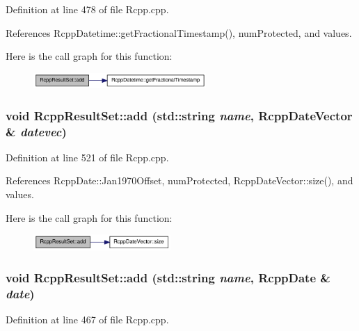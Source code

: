 Definition at line 478 of file Rcpp.cpp.

References RcppDatetime::getFractionalTimestamp(), numProtected, and values.

Here is the call graph for this function:\nopagebreak
\begin{figure}[H]
\begin{center}
\leavevmode
\includegraphics[width=186pt]{classRcppResultSet_a1d921e7a24e50369ae67a1bc63826131_cgraph}
\end{center}
\end{figure}
\hypertarget{classRcppResultSet_ad7efd746596959ce68ca98c690a2f645}{
\subsubsection[{add}]{\setlength{\rightskip}{0pt plus 5cm}void RcppResultSet::add (std::string {\em name}, \/  {\bf RcppDateVector} \& {\em datevec})}}
\label{classRcppResultSet_ad7efd746596959ce68ca98c690a2f645}


Definition at line 521 of file Rcpp.cpp.

References RcppDate::Jan1970Offset, numProtected, RcppDateVector::size(), and values.

Here is the call graph for this function:\nopagebreak
\begin{figure}[H]
\begin{center}
\leavevmode
\includegraphics[width=148pt]{classRcppResultSet_ad7efd746596959ce68ca98c690a2f645_cgraph}
\end{center}
\end{figure}
\hypertarget{classRcppResultSet_ae5cb861a0d6e95cc7ed465ccae2ac4a7}{
\subsubsection[{add}]{\setlength{\rightskip}{0pt plus 5cm}void RcppResultSet::add (std::string {\em name}, \/  {\bf RcppDate} \& {\em date})}}
\label{classRcppResultSet_ae5cb861a0d6e95cc7ed465ccae2ac4a7}


Definition at line 467 of file Rcpp.cpp.

